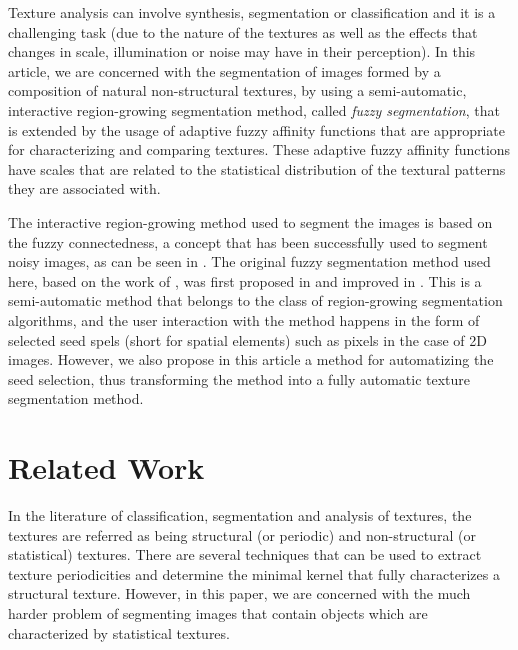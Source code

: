 \documentclass[10pt,twocolumn,letterpaper]{article}
\begin{document}
Texture analysis can involve synthesis, segmentation or classification and it is a challenging task (due to the nature of the textures as well as the effects that changes in scale, illumination or noise may have in their perception). In this article, we are concerned with the segmentation of images formed by a composition of natural non-structural textures, by using a semi-automatic, interactive region-growing segmentation method, called \emph{fuzzy segmentation}, that is extended by the usage of adaptive fuzzy affinity functions that are appropriate for characterizing and comparing textures. These adaptive fuzzy affinity functions have scales that are related to the statistical distribution of the textural patterns they are associated with.

The interactive region-growing method used to segment the images is based on the fuzzy connectedness, a concept that has been successfully used to segment noisy images, as can be seen in \cite{CARV06a}. The original fuzzy segmentation method used here, based on the work of \cite{UDUP96a}, was first proposed in \cite{HERM01a} and improved in \cite{CARV05a}. This is a semi-automatic method that belongs to the class of region-growing segmentation algorithms, and the user interaction with the method happens in the form of selected seed spels (short for spatial elements) such as pixels in the case of 2D images. However, we also propose in this article a method for automatizing the seed selection, thus transforming the method into a fully automatic texture segmentation method.


\section{Related Work}\label{sec:RelWork}
%
In the literature of classification, segmentation and analysis of textures, the textures are referred as being structural (or periodic) and non-structural (or statistical) textures. There are several techniques that can be used to extract texture periodicities and determine the minimal kernel that fully characterizes a structural texture. However, in this paper, we are concerned with the much harder problem of segmenting images that contain objects which are characterized by statistical textures.
\end{document}

